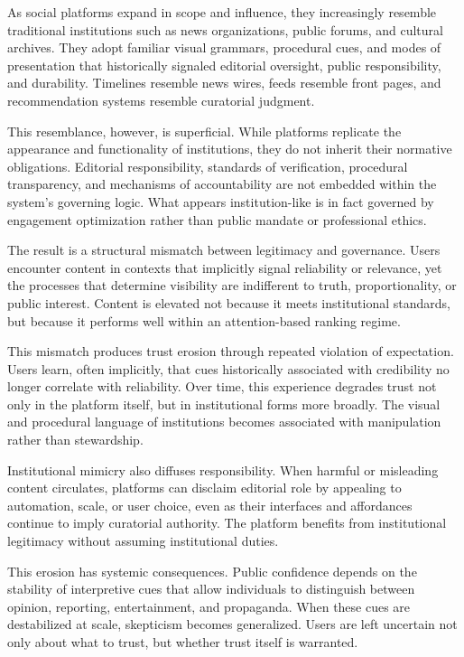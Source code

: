 \documentclass[12pt]{article}
\begin{document}
As social platforms expand in scope and influence, they increasingly resemble traditional institutions such as news organizations, public forums, and cultural archives. They adopt familiar visual grammars, procedural cues, and modes of presentation that historically signaled editorial oversight, public responsibility, and durability. Timelines resemble news wires, feeds resemble front pages, and recommendation systems resemble curatorial judgment.

This resemblance, however, is superficial. While platforms replicate the appearance and functionality of institutions, they do not inherit their normative obligations. Editorial responsibility, standards of verification, procedural transparency, and mechanisms of accountability are not embedded within the system’s governing logic. What appears institution-like is in fact governed by engagement optimization rather than public mandate or professional ethics.

The result is a structural mismatch between legitimacy and governance. Users encounter content in contexts that implicitly signal reliability or relevance, yet the processes that determine visibility are indifferent to truth, proportionality, or public interest. Content is elevated not because it meets institutional standards, but because it performs well within an attention-based ranking regime.

This mismatch produces trust erosion through repeated violation of expectation. Users learn, often implicitly, that cues historically associated with credibility no longer correlate with reliability. Over time, this experience degrades trust not only in the platform itself, but in institutional forms more broadly. The visual and procedural language of institutions becomes associated with manipulation rather than stewardship.

Institutional mimicry also diffuses responsibility. When harmful or misleading content circulates, platforms can disclaim editorial role by appealing to automation, scale, or user choice, even as their interfaces and affordances continue to imply curatorial authority. The platform benefits from institutional legitimacy without assuming institutional duties.

This erosion has systemic consequences. Public confidence depends on the stability of interpretive cues that allow individuals to distinguish between opinion, reporting, entertainment, and propaganda. When these cues are destabilized at scale, skepticism becomes generalized. Users are left uncertain not only about what to trust, but whether trust itself is warranted.
\end{document}
